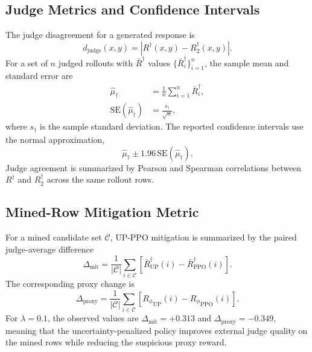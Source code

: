\documentclass[twocolumn,10pt]{article}
\newcommand{\Rphi}{R_{\phi}}
\newcommand{\Rdag}{R^{\dagger}}
\newcommand{\Rtwo}{R^{\dagger}_2}
\begin{document}
\subsection{Judge Metrics and Confidence Intervals}
The judge disagreement for a generated response is
\begin{equation}
    d_{\mathrm{judge}}(x,y)=|\Rdag(x,y)-\Rtwo(x,y)|.
\end{equation}
For a set of $n$ judged rollouts with $\bar R^\dagger$ values $\{\bar R_i^\dagger\}_{i=1}^n$, the sample mean and standard error are
\begin{align}
    \hat{\mu}_{\dagger}&=\frac{1}{n}\sum_{i=1}^{n}\bar R_i^\dagger,\\
    \mathrm{SE}(\hat{\mu}_{\dagger})&=\frac{s_{\dagger}}{\sqrt{n}},
\end{align}
where $s_{\dagger}$ is the sample standard deviation. The reported confidence intervals use the normal approximation,
\begin{equation}
    \hat{\mu}_{\dagger}\pm 1.96\,\mathrm{SE}(\hat{\mu}_{\dagger}).
\end{equation}
Judge agreement is summarized by Pearson and Spearman correlations between $\Rdag$ and $\Rtwo$ across the same rollout rows.

\subsection{Mined-Row Mitigation Metric}
For a mined candidate set $\mathcal{C}$, UP-PPO mitigation is summarized by the paired judge-average difference
\begin{equation}
    \Delta_{\mathrm{mit}}=\frac{1}{|\mathcal{C}|}\sum_{i\in\mathcal{C}}
    \left[\bar R^\dagger_{\mathrm{UP}}(i)-\bar R^\dagger_{\mathrm{PPO}}(i)\right].
\end{equation}
The corresponding proxy change is
\begin{equation}
    \Delta_{\mathrm{proxy}}=\frac{1}{|\mathcal{C}|}\sum_{i\in\mathcal{C}}
    \left[{\Rphi}_{\mathrm{UP}}(i)-{\Rphi}_{\mathrm{PPO}}(i)\right].
\end{equation}
For $\lambda=0.1$, the observed values are $\Delta_{\mathrm{mit}}=+0.313$ and $\Delta_{\mathrm{proxy}}=-0.349$, meaning that the uncertainty-penalized policy improves external judge quality on the mined rows while reducing the suspicious proxy reward.
\end{document}
